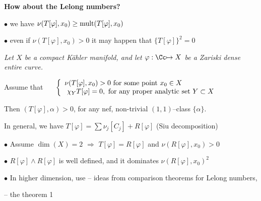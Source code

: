 \begin{slide}
\par\vspace{\bigskipamount}\noindent
{\large\bf How about the Lelong numbers?}

\par\vspace{\bigskipamount}\noindent
$\bullet$ we have \hskip 0.2cm $\nu(T[\varphi], x_0)\geq {\rm mult}(T[\varphi], x_0)$ 

$\bullet$ even if \hskip 0.2cm $\nu(T[\varphi], x_0)> 0$ \hskip 0.2cm 
it may happen that \hskip 0.2cm $\{T[\varphi]\}^2= 0$ 
\par\vspace{\bigskipamount}\noindent
{} {\sl Let $X$ be a compact K\"ahler manifold, and let
$\varphi :{\Cc}{\mapsto X}$ be a Zariski dense entire curve. 

Assume that $ \hskip 0.5cm
\left\{
\begin{array}{ll}
\nu (T[\varphi], x_0)> 0 \hbox{ for some point } x_0\in X \\\
\chi_YT[\varphi]= 0, \hbox{ for any proper analytic set }Y\subset X
\end{array}\right. 
$

\noindent Then $(T[\varphi], \alpha)> 0$,
for any nef, non-trivial $(1,1)$--class $\{\alpha\}$.}
\par\vspace{\bigskipamount}\noindent
{} In general, we have $T[\varphi]= \sum\nu_j[C_j]+ R[\varphi]$
(Siu decomposition)
\par\vspace{\bigskipamount}\noindent
$\bullet$ Assume $\dim(X)= 2$ \hskip 0.2cm $\Longrightarrow$ \hskip 0.2cm
$T[\varphi]= R[\varphi]$ \hskip 0.2cm and \hskip 0.2cm $\nu (R[\varphi], x_0)> 0$

$\bullet$ $R[\varphi]\wedge R[\varphi]$ is well defined, and it dominates $\nu (R[\varphi], x_0)^2$

$\bullet$ In higher dimension, use -- ideas from comparison theorems for Lelong numbers,

\hskip 4.3cm -- the theorem 1


\end{slide}

